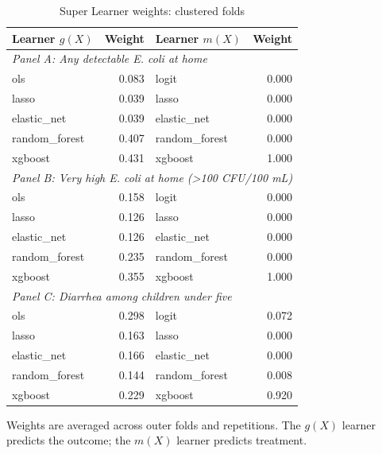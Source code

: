 \begin{table}[htbp]
\centering
\caption{Super Learner weights: clustered folds}
\label{tab:super-learner-weights-clustered}
\small
\begin{tabular}{lrlr}
\toprule
Learner $g(X)$ & Weight & Learner $m(X)$ & Weight \\
\midrule
\multicolumn{4}{l}{\textit{Panel A: Any detectable E. coli at home}} \\
ols & 0.083 & logit & 0.000 \\
lasso & 0.039 & lasso & 0.000 \\
elastic\_net & 0.039 & elastic\_net & 0.000 \\
random\_forest & 0.407 & random\_forest & 0.000 \\
xgboost & 0.431 & xgboost & 1.000 \\
\midrule
\multicolumn{4}{l}{\textit{Panel B: Very high E. coli at home (>100 CFU/100 mL)}} \\
ols & 0.158 & logit & 0.000 \\
lasso & 0.126 & lasso & 0.000 \\
elastic\_net & 0.126 & elastic\_net & 0.000 \\
random\_forest & 0.235 & random\_forest & 0.000 \\
xgboost & 0.355 & xgboost & 1.000 \\
\midrule
\multicolumn{4}{l}{\textit{Panel C: Diarrhea among children under five}} \\
ols & 0.298 & logit & 0.072 \\
lasso & 0.163 & lasso & 0.000 \\
elastic\_net & 0.166 & elastic\_net & 0.000 \\
random\_forest & 0.144 & random\_forest & 0.008 \\
xgboost & 0.229 & xgboost & 0.920 \\
\bottomrule
\end{tabular}
\par\vspace{3pt}
\begin{minipage}{0.9\linewidth}\footnotesize Weights are averaged across outer folds and repetitions. The $g(X)$ learner predicts the outcome; the $m(X)$ learner predicts treatment.\end{minipage}
\end{table}